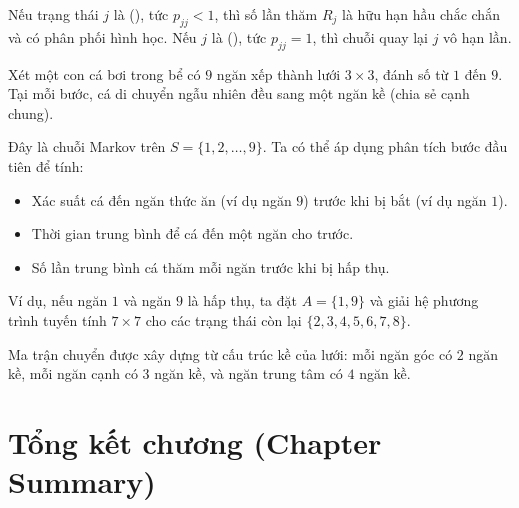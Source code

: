 \begin{tomtat}
Nếu trạng thái $j$ là  (), tức $p_{jj} < 1$, thì số lần thăm
$R_j$ là hữu hạn hầu chắc chắn và có phân phối hình học.
Nếu $j$ là  (), tức $p_{jj} = 1$, thì chuỗi quay lại $j$ vô hạn lần.
\end{tomtat}

\begin{example}
\label{ex:fish-maze}
Xét một con cá bơi trong bể có $9$ ngăn xếp thành lưới $3 \times 3$, đánh số từ $1$ đến $9$.
Tại mỗi bước, cá di chuyển ngẫu nhiên đều sang một ngăn kề (chia sẻ cạnh chung).

Đây là chuỗi Markov trên $S = \{1, 2, \ldots, 9\}$. Ta có thể áp dụng phân tích bước đầu tiên
để tính:
\begin{itemize}[nosep]
  \item Xác suất cá đến ngăn thức ăn (ví dụ ngăn $9$) trước khi bị bắt (ví dụ ngăn $1$).
  \item Thời gian trung bình để cá đến một ngăn cho trước.
  \item Số lần trung bình cá thăm mỗi ngăn trước khi bị hấp thụ.
\end{itemize}

Ví dụ, nếu ngăn $1$ và ngăn $9$ là hấp thụ, ta đặt $A = \{1, 9\}$ và giải hệ phương trình
tuyến tính $7 \times 7$ cho các trạng thái còn lại $\{2, 3, 4, 5, 6, 7, 8\}$.

Ma trận chuyển được xây dựng từ cấu trúc kề của lưới: mỗi ngăn góc có $2$ ngăn kề,
mỗi ngăn cạnh có $3$ ngăn kề, và ngăn trung tâm có $4$ ngăn kề.
\end{example}

\section{Tổng kết chương (Chapter Summary)}
\label{sec:ch5-summary}

